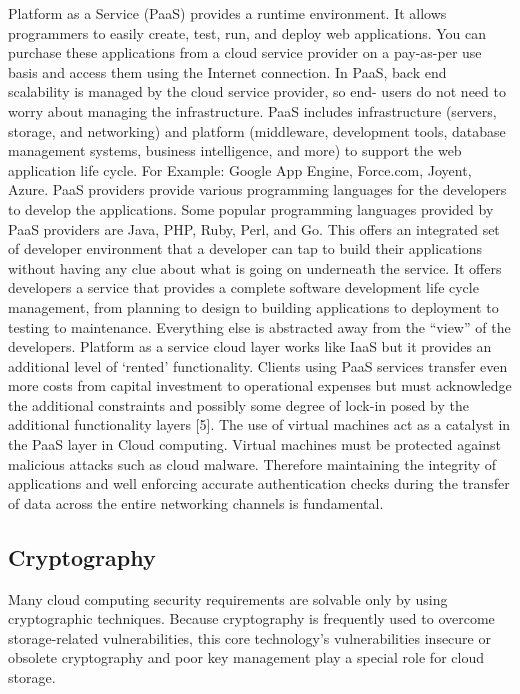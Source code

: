 \documentclass[conference]{IEEEtran}
\begin{document}
Platform as a Service (PaaS) provides a runtime environment. It allows programmers to easily create, test, run, and deploy web applications. You can purchase these applications from a cloud service provider on a pay-as-per use basis and access them using the Internet connection. In PaaS, back end scalability is managed by the cloud service provider, so end- users do not need to worry about managing the infrastructure. PaaS includes infrastructure (servers, storage, and networking) and platform (middleware, development tools, database management systems, business intelligence, and more) to support the web application life cycle. For Example: Google App Engine, Force.com, Joyent, Azure. PaaS providers provide various programming languages for the developers to develop the applications. Some popular programming languages provided by PaaS providers are Java, PHP, Ruby, Perl, and Go. This offers an integrated set of developer environment that a developer can tap to build their applications without having any clue about what is going on underneath the service. It offers developers a service that provides a complete software development life cycle management, from planning to design to building applications to deployment to testing to maintenance. Everything else is abstracted away from the “view” of the developers. Platform as a service cloud layer works like IaaS but it provides an additional level of ‘rented’ functionality. Clients using PaaS services transfer even more costs from capital investment to operational expenses but must acknowledge the additional constraints and possibly some degree of lock-in posed by the additional functionality layers [5]. The use of virtual machines act as a catalyst in the PaaS layer in Cloud computing. Virtual machines must be protected against malicious attacks such as cloud malware. Therefore maintaining the integrity of applications and well enforcing accurate authentication checks during the transfer of data across the entire networking channels is fundamental.

\subsection{Cryptography}
Many cloud computing security requirements are solvable only by using cryptographic techniques. Because cryptography is frequently used to
overcome storage-related vulnerabilities, this core
technology’s vulnerabilities insecure or obsolete
cryptography and poor key management play a special
role for cloud storage.
\end{document}

